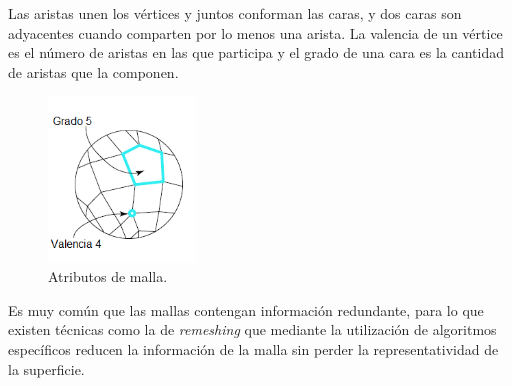 Las aristas unen los vértices y juntos conforman las caras, y dos caras son adyacentes cuando comparten por lo menos una arista. La valencia de un vértice es el número de aristas en las que participa y el grado de una cara es la cantidad de aristas que la componen.

\begin{figure}[H]
  \centering
    \includegraphics[width=0.35\textwidth]{./Cap2_videomapping/MallaAtributos}
  \caption{Atributos de malla.}
  \label{fig:MallaAtributos}
\end{figure}
Es muy común que las mallas contengan información redundante, para lo que existen técnicas como la de \emph{remeshing} que mediante la utilización de algoritmos específicos reducen la información de la malla sin perder la representatividad de la superficie.

